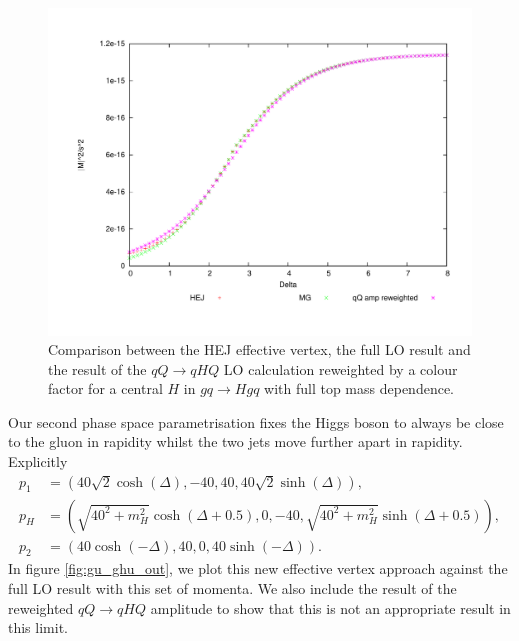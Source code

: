 \begin{figure}[t]
\centering
\includegraphics[scale=0.5]{Images/qg_qgH_central.pdf}
\caption{Comparison between the HEJ effective vertex, the full LO result and the result of the $qQ \to qHQ$ LO calculation reweighted by a colour factor for a central $H$ in $gq \to Hgq$ with full top mass dependence.}
\label{fig:gu_ghu_cen}
\end{figure}
Our second phase space parametrisation fixes the Higgs boson to always be close to the gluon in rapidity whilst the two jets move further apart in rapidity. Explicitly 
\begin{subequations}
\begin{align}
p_1 &= (40 \sqrt{2} \cosh(\Delta),-40,40,40 \sqrt{2} \sinh(\Delta)), \\
p_H &= (\sqrt{40^2+m_H^2} \cosh(\Delta+0.5), 0,-40,\sqrt{40^2+m_H^2}  \sinh(\Delta + 0.5)), \\
p_2 &= (40 \cosh(-\Delta),40,0,40 \sinh(-\Delta)).
\end{align}
\end{subequations}
In figure \ref{fig:gu_ghu_out}, we plot this new effective vertex approach against the full LO result with this set of momenta. We also include the result of the reweighted $qQ \to qHQ$ amplitude to show that this is not an appropriate result in this limit. 
